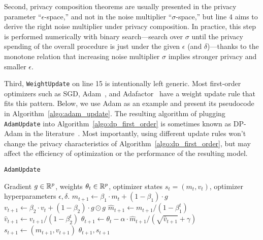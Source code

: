 Second, privacy composition theorems are usually presented in the privacy parameter ``$\epsilon$-space,'' and not in the noise multiplier ``$\sigma$-space,'' but line 4 aims to derive the right noise multiplier under privacy composition.
In practice, this step is performed numerically with binary search---search over $\sigma$ until the privacy spending of the overall procedure is just under the given $\epsilon$ (and $\delta$)---thanks to the monotone relation that increasing noise multiplier $\sigma$ implies stronger privacy and smaller $\epsilon$.

Third, \texttt{WeightUpdate} on line 15 is intentionally left generic. 
Most first-order optimizers such as SGD, Adam~\citep{kingma2014adam}, and Adafactor~\citep{shazeer2018adafactor} have a weight update rule that fits this pattern. 
Below, we use Adam as an example and present its pseudocode in Algorithm~\ref{algo:adam_update}.
The resulting algorithm of plugging \texttt{AdamUpdate} into Algorithm~\ref{algo:dp_first_order} is sometimes known as DP-Adam in the literature~\citep{li2022large}.
Most importantly, using different update rules won't change the privacy characteristics of Algorithm~\ref{algo:dp_first_order}, but may affect the efficiency of optimization or the performance of the resulting model.

\begin{algorithm}[H]
\centering
\caption{ \texttt{AdamUpdate} }
\begin{algorithmic}[1]
  Gradient $g \in \mathbb{R}^p$, weights $\theta_t \in \mathbb{R}^p$, optimizer states $s_t = (m_t, v_t)$, optimizer hyperparameters $\epsilon, \delta$.
  \State
  $
  m_{t+1} \leftarrow
    \beta_{1} \cdot m_{t} + \left(1-\beta_{1}\right) \cdot g$
  \State
  $v_{t+1} \leftarrow
    \beta_{2} \cdot v_{t}+\left(1-\beta_{2}\right) \cdot g \odot g
  $
  \State
  $
  \widehat{m}_{t+1} \leftarrow m_{t+1} /\left(1-\beta_{1}^{t}\right)$
  \State
  $\widehat{v}_{t+1} \leftarrow v_{t+1} /\left(1-\beta_{2}^{t}\right)$
  \State
  $
  \theta_{t+1} \leftarrow \theta_{t}-\alpha \cdot \widehat{m}_{t+1} /\left(\sqrt{\widehat{v}_{t+1}}+\gamma\right)
  $
  \State $s_{t+1}\gets (m_{t +1}, v_{t + 1})$
  \State  \Return $\theta_{t+1}, s_{t+1}$
\end{algorithmic}
\label{algo:adam_update}
\end{algorithm}

